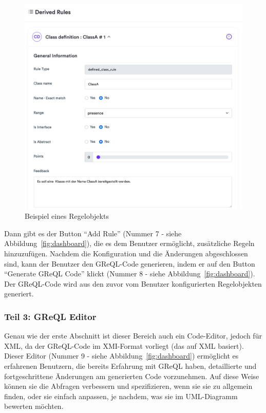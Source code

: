 \begin{figure}[h!]
    \centering
    \includegraphics[width=16cm]{images/derived_rule}
    \caption{Beispiel eines Regelobjekts}
    \label{fig:rule_exemple}
\end{figure}

Dann gibt es der Button ``Add Rule'' (Nummer 7 - siehe Abbildung~\ref{fig:dashboard}), die es dem Benutzer ermöglicht,
zusätzliche Regeln hinzuzufügen. Nachdem die Konfiguration und die Änderungen abgeschlossen sind, kann der Benutzer den
GReQL-Code generieren, indem er auf den Button ``Generate GReQL Code'' klickt (Nummer 8 - siehe Abbildung~\ref{fig:dashboard}).
Der GReQL-Code wird aus den zuvor vom Benutzer konfigurierten Regelobjekten generiert.

\subsubsection{Teil 3: GReQL Editor}

Genau wie der erste Abschnitt ist dieser Bereich auch ein Code-Editor, jedoch für XML, da der GReQL-Code im XMI-Format
vorliegt (das auf XML basiert). Dieser Editor (Nummer 9 - siehe Abbildung~\ref{fig:dashboard}) ermöglicht es erfahrenen
Benutzern, die bereits Erfahrung mit GReQL haben, detaillierte und fortgeschrittene Änderungen am generierten Code
vorzunehmen. Auf diese Weise können sie die Abfragen verbessern und spezifizieren, wenn sie sie zu allgemein finden,
oder sie einfach anpassen, je nachdem, was sie im UML-Diagramm bewerten möchten.

